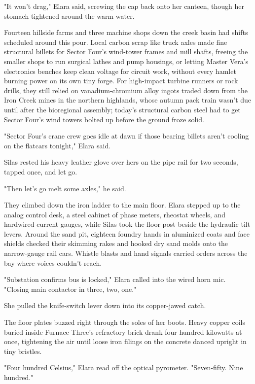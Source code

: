 "It won't drag," Elara said, screwing the cap back onto her canteen, though her stomach tightened around the warm water.

Fourteen hillside farms and three machine shops down the creek basin had shifts scheduled around this pour. Local carbon scrap like truck axles made fine structural billets for Sector Four's wind-tower frames and mill shafts, freeing the smaller shops to run surgical lathes and pump housings, or letting Master Vera's electronics benches keep clean voltage for circuit work, without every hamlet burning power on its own tiny forge. For high-impact turbine runners or rock drills, they still relied on vanadium-chromium alloy ingots traded down from the Iron Creek mines in the northern highlands, whose autumn pack train wasn't due until after the bioregional assembly; today's structural carbon steel had to get Sector Four's wind towers bolted up before the ground froze solid.

"Sector Four's crane crew goes idle at dawn if those bearing billets aren't cooling on the flatcars tonight," Elara said.

Silas rested his heavy leather glove over hers on the pipe rail for two seconds, tapped once, and let go.

"Then let's go melt some axles," he said.

They climbed down the iron ladder to the main floor. Elara stepped up to the analog control desk, a steel cabinet of phase meters, rheostat wheels, and hardwired current gauges, while Silas took the floor post beside the hydraulic tilt levers. Around the sand pit, eighteen foundry hands in aluminized coats and face shields checked their skimming rakes and hooked dry sand molds onto the narrow-gauge rail cars. Whistle blasts and hand signals carried orders across the bay where voices couldn't reach.

"Substation confirms bus is locked," Elara called into the wired horn mic. "Closing main contactor in three, two, one."

She pulled the knife-switch lever down into its copper-jawed catch.

The floor plates buzzed right through the soles of her boots. Heavy copper coils buried inside Furnace Three's refractory brick drank four hundred kilowatts at once, tightening the air until loose iron filings on the concrete danced upright in tiny bristles.

"Four hundred Celsius," Elara read off the optical pyrometer. "Seven-fifty. Nine hundred."


